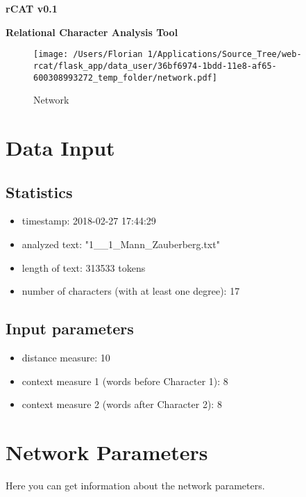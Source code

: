 \documentclass{article}%
\begin{document}
%
\normalsize%
\pagestyle{header}%
\begin{minipage}{\textwidth}%
\centering%
\begin{Large}%
\textbf{rCAT v0.1}%
\end{Large}%
\linebreak%
\begin{large}%
\textbf{Relational Character Analysis Tool}%
\end{large}%
\end{minipage}%


\begin{figure}[h!]%
\centering%
\texttt{[image: /Users/Florian 1/Applications/Source\_Tree/web-rcat/flask\_app/data\_user/36bf6974-1bdd-11e8-af65-600308993272\_temp\_folder/network.pdf]}%
\caption{Network}%
\end{figure}

%
\section{Data Input}%
\subsection*{Statistics}%
\begin{itemize}%
\item%
timestamp: 2018{-}02{-}27 17:44:29%
\item%
analyzed text: "1\_\_1\_Mann\_Zauberberg.txt"%
\item%
length of text: 313533 tokens%
\item%
number of characters (with at least one degree): 17%
\end{itemize}

%
\subsection*{Input parameters}%
\begin{itemize}%
\item%
distance measure: 10%
\item%
context measure 1 (words before Character 1): 8%
\item%
context measure 2 (words after Character 2): 8%
\end{itemize}

%
\section{Network Parameters}%
Here you can get information about the network parameters.%
\end{document}
